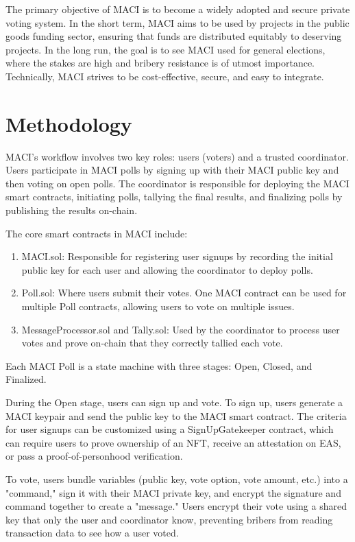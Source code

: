 \documentclass[11pt]{article}
\begin{document}
The primary objective of MACI is to become a widely adopted and secure private voting system. In the short term, MACI aims to be used by projects in the public goods funding sector, ensuring that funds are distributed equitably to deserving projects. In the long run, the goal is to see MACI used for general elections, where the stakes are high and bribery resistance is of utmost importance. Technically, MACI strives to be cost-effective, secure, and easy to integrate.
\section{Methodology}
\label{sec:orgca407cf}

MACI's workflow involves two key roles: users (voters) and a trusted coordinator. Users participate in MACI polls by signing up with their MACI public key and then voting on open polls. The coordinator is responsible for deploying the MACI smart contracts, initiating polls, tallying the final results, and finalizing polls by publishing the results on-chain.

The core smart contracts in MACI include:

\begin{enumerate}
\item MACI.sol: Responsible for registering user signups by recording the initial public key for each user and allowing the coordinator to deploy polls.

\item Poll.sol: Where users submit their votes. One MACI contract can be used for multiple Poll contracts, allowing users to vote on multiple issues.

\item MessageProcessor.sol and Tally.sol: Used by the coordinator to process user votes and prove on-chain that they correctly tallied each vote.
\end{enumerate}

Each MACI Poll is a state machine with three stages: Open, Closed, and Finalized.

During the Open stage, users can sign up and vote. To sign up, users generate a MACI keypair and send the public key to the MACI smart contract. The criteria for user signups can be customized using a SignUpGatekeeper contract, which can require users to prove ownership of an NFT, receive an attestation on EAS, or pass a proof-of-personhood verification.

To vote, users bundle variables (public key, vote option, vote amount, etc.) into a "command," sign it with their MACI private key, and encrypt the signature and command together to create a "message." Users encrypt their vote using a shared key that only the user and coordinator know, preventing bribers from reading transaction data to see how a user voted.
\end{document}
